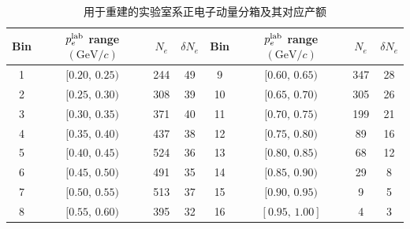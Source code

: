 \begin{table}[htbp]
\centering
\renewcommand{\arraystretch}{1.15}
\begin{tabular}{cccccccc}
\hline\hline
\textbf{Bin} & $p_e^{\rm lab}$ range $(\mathrm{GeV}/c)$ & $N_e$ & $\delta N_e$&\textbf{Bin} & $p_e^{\rm lab}$ range $(\mathrm{GeV}/c)$ & $N_e$ & $\delta N_e$ \\
\hline
1  & $[0.20,\,0.25)$ & 244 & 49 &9  & $[0.60,\,0.65)$ & 347 & 28 \\
2  & $[0.25,\,0.30)$ & 308 & 39 &10 & $[0.65,\,0.70)$ & 305 & 26 \\
3  & $[0.30,\,0.35)$ & 371 & 40 &11 & $[0.70,\,0.75)$ & 199 & 21 \\
4  & $[0.35,\,0.40)$ & 437 & 38 &12 & $[0.75,\,0.80)$ & 89  & 16 \\
5  & $[0.40,\,0.45)$ & 524 & 36 &13 & $[0.80,\,0.85)$ & 68  & 12 \\
6  & $[0.45,\,0.50)$ & 491 & 35 &14 & $[0.85,\,0.90)$ & 29  & 8 \\
7  & $[0.50,\,0.55)$ & 513 & 37 &15 & $[0.90,\,0.95)$ & 9   & 5 \\
8  & $[0.55,\,0.60)$ & 395 & 32 &16 & $[0.95,\,1.00]$ & 4   & 3 \\
\hline\hline
\end{tabular}
\caption{用于重建的实验室系正电子动量分箱及其对应产额}
\label{tab:electron_spectrum_bins}
\end{table}
